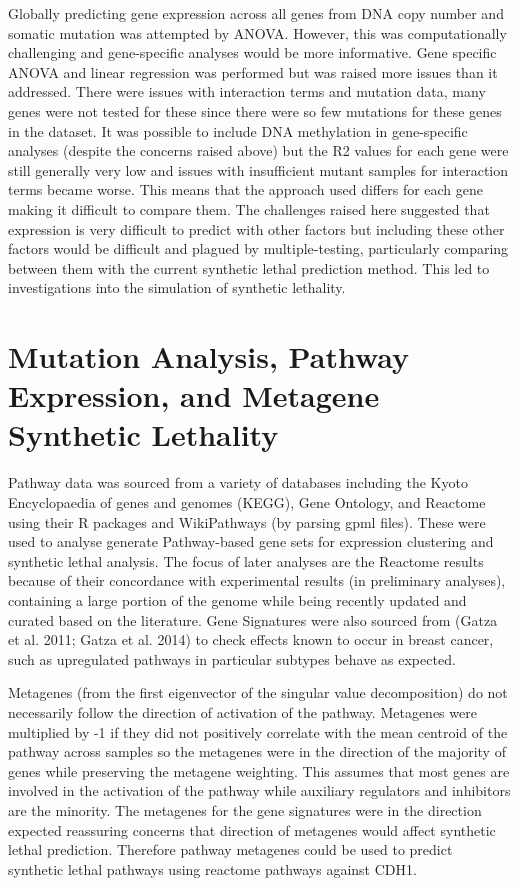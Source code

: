 Globally predicting gene expression across all genes from DNA copy number and somatic mutation was attempted by ANOVA. However, this was computationally challenging and gene-specific analyses would be more informative. Gene specific ANOVA and linear regression was performed but was raised more issues than it addressed. There were issues with interaction terms and mutation data, many genes were not tested for these since there were so few mutations for these genes in the dataset.  It was possible to include DNA methylation in gene-specific analyses (despite the concerns raised above) but the R2 values for each gene were still generally very low and issues with insufficient mutant samples for interaction terms became worse. This means that the approach used differs for each gene making it difficult to compare them. The challenges raised here suggested that expression is very difficult to predict with other factors but including these other factors would be difficult and plagued by multiple-testing, particularly comparing between them with the current synthetic lethal prediction method. This led to investigations into the simulation of synthetic lethality.

\section{Mutation Analysis, Pathway Expression, and Metagene Synthetic Lethality}

Pathway data was sourced from a variety of databases including the Kyoto Encyclopaedia of genes and genomes (KEGG), Gene Ontology, and Reactome using their R packages and WikiPathways (by parsing gpml files). These were used to analyse generate Pathway-based gene sets for expression clustering and synthetic lethal analysis. The focus of later analyses are the Reactome results because of their concordance with experimental results (in preliminary analyses), containing a large portion of the genome while being recently updated and curated based on the literature. Gene Signatures were also sourced from (Gatza et al. 2011; Gatza et al. 2014) to check effects known to occur in breast cancer, such as upregulated pathways in particular subtypes behave as expected.

Metagenes (from the first eigenvector of the singular value decomposition) do not necessarily follow the direction of activation of the pathway. Metagenes were multiplied by -1 if they did not positively correlate with the mean centroid of the pathway across samples so the metagenes were in the direction of the majority of genes while preserving the metagene weighting. This assumes that most genes are involved in the activation of the pathway while auxiliary regulators and inhibitors are the minority. The metagenes for the gene signatures were in the direction expected reassuring concerns that direction of metagenes would affect synthetic lethal prediction. Therefore pathway metagenes could be used to predict synthetic lethal pathways using reactome pathways against CDH1.

